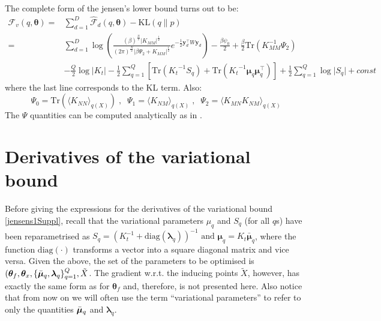 \par
The complete form of the jensen's lower bound turns out to be:
\begin{align}
\mathcal{F}_v(q, \boldsymbol \theta) = {}& \sum_{d=1}^{D} 
	\hat{\mathcal{F}}_d(q, \boldsymbol \theta) -  \text{KL}(q \parallel p) \nonumber \\
	= {}& 
	\sum_{d=1}^{D} 
		\log \left( 
		\frac{(\beta)^{\frac{N}{2}} \vert \mathit{K_{MM}} \vert ^\frac{1}{2} }
			 {(2\pi)^{\frac{N}{2}} \vert \beta \Psi_2 + \mathit{K_{MM}}  \vert ^\frac{1}{2} } 	
		 e^{-\frac{1}{2} \mathbf{y}^{\top}_{d} W \mathbf{y}_d} 
		 \right) -
		 \frac{\beta \psi_0}{2} + \frac{\beta}{2} 
		 \text{Tr} \left( \mathit{K_{MM}^{-1}} \Psi_2 \right)  \nonumber \\
{}&	- \frac{Q}{2} \log \vert \mathit{K_t} \vert - \frac{1}{2} \sum_{q=1}^{Q}
	  \left[ \text{Tr} \left( \mathit{K_t}^{-1} \mathit{S_q} \right)	  
	  	   + \text{Tr} \left( \mathit{K_t}^{-1} \boldsymbol \mu_q \boldsymbol \mu_q^\top \right) \right] 
	 + \frac{1}{2} \sum_{q=1}^Q \log \vert \mathit{S_q} \vert + const  \label{boundFinal}
\end{align}
where the last line corresponds to the KL term. Also:
\begin{equation}
\label{psis}
\Psi_0 = \text{Tr}(\langle \mathit{K_{NN}} \rangle_{q(\mathit{X})}) \;, \;\;
\Psi_1 = \langle \mathit{K_{NM}} \rangle_{q(\mathit{X})} \;, \;\;
\Psi_2 = \langle \mathit{K_{MN}} \mathit{K_{NM}} \rangle_{q(\mathit{X})}
\end{equation}
The $\Psi$ quantities can be computed analytically as in \cite{BayesianGPLVM}.



\section{Derivatives of the variational bound}
Before giving the expressions for the derivatives of the variational
bound \eqref{jensens1Suppl}, recall that the variational parameters
$\mu_q$ and $S_q$ (for all $q$s) have been reparametrised as $S_q =
\left( \mathit{K}_t^{-1} + \text{diag}(\boldsymbol \lambda_q)
\right)^{-1} \text{ and } \boldsymbol \mu_q = K_t \bar{\boldsymbol
  \mu}_q$, where the function $\text{diag}(\cdot)$ transforms a vector
into a square diagonal matrix and vice versa. Given the above, the set
of the parameters to be optimised is $( \boldsymbol \theta_f,
\boldsymbol \theta_x, \{ \bar{\boldsymbol \mu}_q, \boldsymbol \lambda_q
\}_{q=1}^Q, \tilde{X}$. The gradient w.r.t. the inducing points
$\tilde{X}$, however, has exactly the same form as for $\boldsymbol
\theta_f$ and, therefore, is not presented here. Also notice that from
now on we will often use the term ``variational parameters'' to refer
to only the quantities $\bar{\boldsymbol \mu}_q$ and $\boldsymbol \lambda_q$.

